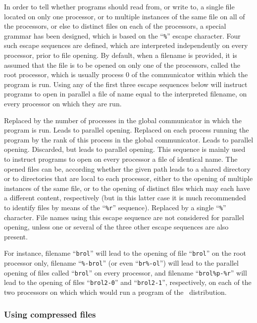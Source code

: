 In order to tell whether programs should read from, or write to, a single
file located on only one processor, or to multiple instances of the same
file on all of the processors, or else to distinct files on each of the
processors, a special grammar has been designed, which is based on the
``{\tt \%}'' escape character. Four such escape sequences are defined,
which are interpreted independently on every processor, prior to
file opening. By default, when a filename is provided, it is assumed
that the file is to be opened on only one of the processors, called
the root processor, which is usually process $0$ of the communicator
within which the program is run. Using any of the first three
escape sequences below will instruct programs to open in parallel a file
of name equal to the interpreted filename, on every processor on which they
are run. 
\begin{itemize}
\iteme[{\tt \%p}]
Replaced by the number of processes in the global communicator in
which the program is run. Leads to parallel opening.
\iteme[{\tt \%r}]
Replaced on each process running the program by the rank of this
process in the global communicator. Leads to parallel opening.
\iteme[{\tt \%-}]
Discarded, but leads to parallel opening. This sequence is mainly used to
instruct programs to open on every processor a file of identical
name. The opened files can be, according whether the given path leads
to a shared directory or to directories that are local to each
processor, either to the opening of multiple instances of the same
file, or to the opening of distinct files which may each have a
different content, respectively (but in this latter case it is much
recommended to identify files by means of the ``{\tt \%r}'' sequence).
\iteme[{\tt \%\%}]
Replaced by a single ``{\tt \%}'' character. File names using this
escape sequence are not considered for parallel opening, unless one or
several of the three other escape sequences are also present.
\end{itemize}
For instance, filename ``{\tt brol}'' will lead to the
opening of file ``{\tt brol}'' on the root processor only, filename
``{\tt \%-brol}'' (or even ``{\tt br\%-ol}'') will lead to the
parallel opening of files called ``{\tt brol}'' on every processor,
and filename ``{\tt brol\%p-\%r}'' will lead to the opening of files
``{\tt brol2-0}'' and ``{\tt brol2-1}'', respectively, on each of the
two processors on which which would run a program of the
\ptscotch\ distribution.

\subsubsection{Using compressed files}
\label{sec-prog-compressed}

